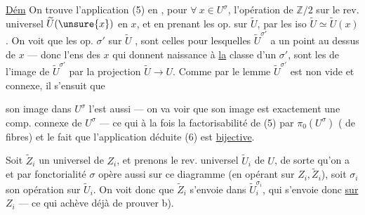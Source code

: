 \uline{Dém} On trouve l'application (5) en
, pour $\forall\ x\in U^\sigma$, l'opération  de
$\mathbb Z/2$ sur le rev. universel $\widetilde U(\unsure{x})$ 
en $x$, et en  prenant les
op.  sur $\widetilde U$,  par
les iso $\widetilde U\simeq\widetilde U(x)$. On voit que
les  op. $\sigma'$  sur $\widetilde U$ , sont
celles pour lesquelles  $\widetilde U^{\sigma'}$ a un
point au dessus de $x$ --- donc l'ens
des $x$ qui donnent naissance à \uline{la}
classe d'un $\sigma'$, sont les  de
l'image de $\widetilde U^{\sigma'}$ par la projection
$\widetilde U\longrightarrow U$. Comme par le lemme $\widetilde U^{\sigma'}$
est non vide et connexe, il s'ensuit que

son image dans $U^\sigma$ l'est aussi --- on va
voir que son image est exactement une comp.
connexe de $U^\sigma$ --- ce qui à la fois 
la factorisabilité de (5) par  $\pi_0(U^\sigma)$
(  de  fibres) et le fait que
l'application déduite (6) est \uline{bijective}.

Soit $\widetilde Z_i$ un  universel de $Z_i$,
et prenons le rev. universel 
$\widetilde U_i$ de $U$, de sorte qu'on a
et par fonctorialité $\sigma$ opère aussi sur ce
diagramme (en opérant  sur $Z_i,\widetilde Z_i$),
soit $\sigma_i$ son opération sur $\widetilde U_i$. On
voit donc que $\widetilde Z_i$ s'envoie dans $\widetilde U_i^{\sigma_i}$,
qui s'envoie donc \uline{sur} $Z_i$ --- ce qui achève
déjà de prouver b).


